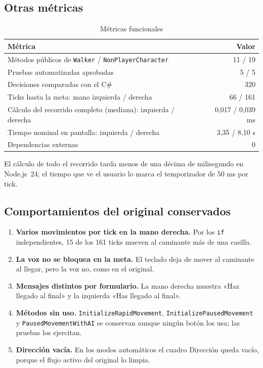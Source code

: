 \documentclass[12pt,a4paper]{article}
\begin{document}
\subsection{Otras métricas}
\begin{table}[H]
\centering\small
\caption{Métricas funcionales}
\begin{tabular}{p{7.4cm}r}
\toprule Métrica & Valor\\\midrule
Métodos públicos de \texttt{Walker} / \texttt{NonPlayerCharacter} & 11 / 19\\
Pruebas automatizadas aprobadas & 5 / 5\\
Decisiones comparadas con el C\# & 320\\
Ticks hasta la meta: mano izquierda / derecha & 66 / 161\\
Cálculo del recorrido completo (mediana): izquierda / derecha & 0,017 / 0,039 ms\\
Tiempo nominal en pantalla: izquierda / derecha & 3,35 / 8,10 s\\
Dependencias externas & 0\\
\bottomrule
\end{tabular}
\end{table}
El cálculo de todo el recorrido tarda menos de una décima de milisegundo en Node.js~24;
el tiempo que ve el usuario lo marca el temporizador de 50 ms por tick.

\subsection{Comportamientos del original conservados}\label{sec:hallazgos}
\begin{enumerate}
  \item \textbf{Varios movimientos por tick en la mano derecha.} Por los \texttt{if}
        independientes, 15 de los 161 ticks mueven al caminante más de una casilla.
  \item \textbf{La voz no se bloquea en la meta.} El teclado deja de mover al
        caminante al llegar, pero la voz no, como en el original.
  \item \textbf{Mensajes distintos por formulario.} La mano derecha muestra
        «Haz llegado al final» y la izquierda «Has llegado al final».
  \item \textbf{Métodos sin uso.} \texttt{InitializeRapidMovement},
        \texttt{InitializePausedMovement} y \texttt{PausedMovementWithAI} se
        conservan aunque ningún botón los usa; las pruebas los ejercitan.
  \item \textbf{Dirección vacía.} En los modos automáticos el cuadro Dirección
        queda vacío, porque el flujo activo del original lo limpia.
\end{enumerate}
\end{document}
